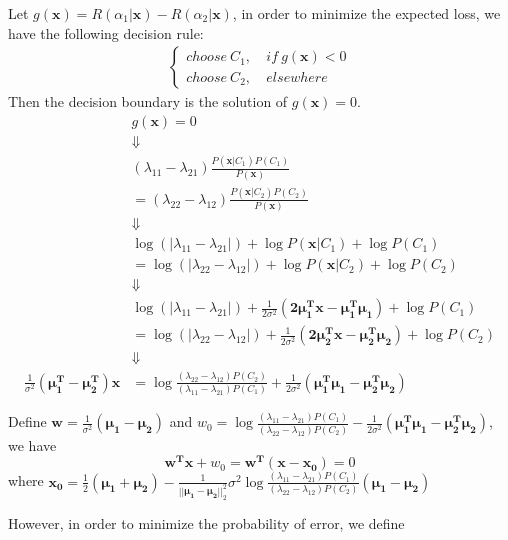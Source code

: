 \documentclass{article}
\renewcommand{\b}[1]{\bm{#1}}
\begin{document}
\begin{enumerate}
\begin{enumerate}
        Let $g(\b{x})=R(\alpha_1|\b{x})-R(\alpha_2|\b{x})$, in order to minimize the expected loss, we have the following decision rule:
        \begin{align*}
            \left\{\begin{aligned}
                choose\ C_1,&\ if\ g(\b{x}) < 0\\
                choose\ C_2,&\ elsewhere
            \end{aligned}\right.
        \end{align*}
        Then the decision boundary is the solution of $g(\b{x})=0$.
        \begin{align*}
            &g(\b{x}) = 0\\
            &\Downarrow\\
            &(\lambda_{11}-\lambda_{21})\frac{P(\b{x}|C_1)P(C_1)}{P(\b{x})}\\
            &= (\lambda_{22}-\lambda_{12})\frac{P(\b{x}|C_2)P(C_2)}{P(\b{x})}\\
            &\Downarrow\\
            &\log{(|\lambda_{11}-\lambda_{21}|)}+\log{P(\b{x}|C_1)}+\log{P(C_1)} \\
            &= \log{(|\lambda_{22}-\lambda_{12}|)}+\log{P(\b{x}|C_2)}+\log{P(C_2)}\\
            &\Downarrow\\
            &\log{(|\lambda_{11}-\lambda_{21}|)}+\frac{1}{2\sigma^2}(\b{2\mu_1^Tx-\mu_1^T\mu_1})+\log{P(C_1)} \\
            &= \log{(|\lambda_{22}-\lambda_{12}|)}+\frac{1}{2\sigma^2}(\b{2\mu_2^Tx-\mu_2^T\mu_2})+\log{P(C_2)}\\
            &\Downarrow\\
            \frac{1}{\sigma^2}(\b{\mu_1^T-\mu_2^T})\b{x}&=\log{\frac{(\lambda_{22}-\lambda_{12})P(C_2)}{(\lambda_{11}-\lambda_{21})P(C_1)}}+\frac{1}{2\sigma^2}(\b{\mu_1^T\mu_1-\mu^T_2\mu_2})
        \end{align*}
        \par Define $\b{w} = \frac{1}{\sigma^2}(\b{\mu_1-\mu_2})$ and $w_0=\log{\frac{(\lambda_{11}-\lambda_{21})P(C_1)}{(\lambda_{22}-\lambda_{12})P(C_2)}}-\frac{1}{2\sigma^2}(\b{\mu_1^T\mu_1-\mu^T_2\mu_2})$, we have
        \[\b{w^Tx}+w_0=\b{w^T(x-x_0)}=0\]
        where $\b{x_0}=\frac{1}{2}(\b{\mu_1+\mu_2})-\frac{1}{||\b{\mu_1-\mu_2}||_2^2}\sigma^2\log{\frac{(\lambda_{11}-\lambda_{21})P(C_1)}{(\lambda_{22}-\lambda_{12})P(C_2)}(\b{\mu_1-\mu_2})}$
        \par However, in order to minimize the probability of error, we define

\end{enumerate}
\end{enumerate}
\end{document}
